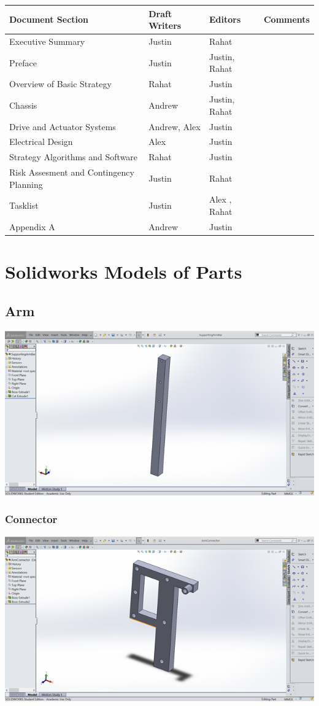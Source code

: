 \documentclass[12pt]{article}
\begin{document}
\begin{longtable}{| L{8em} | L{5em} | L{5em} | L{5em} |}
\hline
Document Section & Draft Writers & Editors & Comments \\
\hline
Executive Summary& Justin &  Rahat & \\
\hline
Preface & Justin & Justin, Rahat & \\
\hline
Overview of Basic Strategy & Rahat & Justin & \\
\hline
Chassis & Andrew & Justin, Rahat & \\
\hline
Drive and Actuator Systems & Andrew, Alex & Justin & \\
\hline
Electrical Design & Alex & Justin & \\
\hline
Strategy Algorithms and Software & Rahat & Justin & \\
\hline
Risk Assesment and Contingency Planning & Justin & Rahat & \\
\hline
Tasklist & Justin & Alex , Rahat & \\
\hline
Appendix A & Andrew & Justin & \\
\hline
\end{longtable}

\appendix
\section{Solidworks Models of Parts} \label{App:AppendixA}
\subsection{Arm}
\includegraphics{arm}
\subsubsection{Connector}
\includegraphics{connector}
\end{document}
